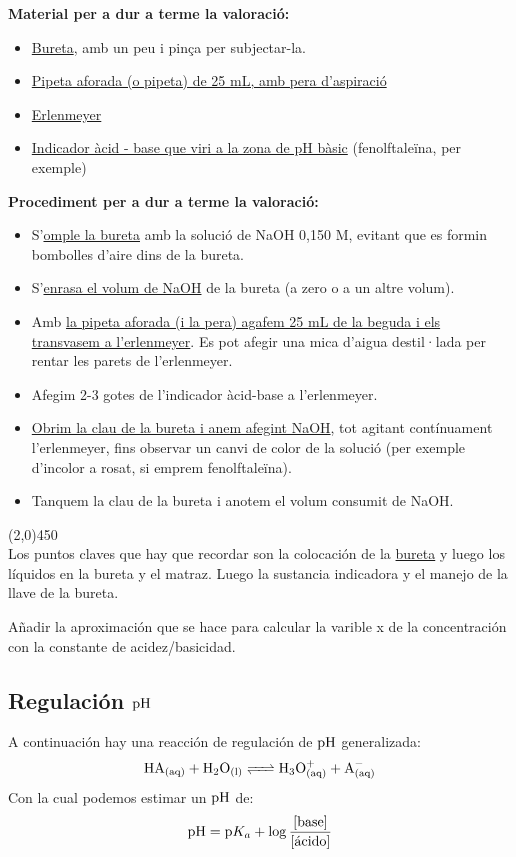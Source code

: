 \documentclass[arial,a4paper,print]{article}
\begin{document}
\textbf{Material per a dur a terme la valoració:}
\begin{itemize}
	\item \underline{Bureta}, amb un peu i pinça per subjectar-la.
	\item \underline{Pipeta aforada (o pipeta) de 25 mL, amb pera d’aspiració}
	\item \underline{Erlenmeyer}
	\item \underline{Indicador àcid - base que viri a la zona de pH bàsic} (fenolftaleïna, per exemple)
\end{itemize}
\textbf{Procediment per a dur a terme la valoració:}
\begin{itemize}
	\item S’\underline{omple la bureta} amb la solució de NaOH 0,150 M, evitant que es formin
bombolles d’aire dins de la bureta.
	\item S’\underline{enrasa el volum de NaOH} de la bureta (a zero o a un altre volum).
	\item Amb \underline{la pipeta aforada (i la pera) agafem 25 mL de la beguda i els transvasem a
l’erlenmeyer}. Es pot afegir una mica d’aigua destil·lada per rentar les parets
de l’erlenmeyer.
	\item Afegim 2-3 gotes de l’indicador àcid-base a l’erlenmeyer.
	\item \underline{Obrim la clau de la bureta i anem afegint NaOH}, tot agitant contínuament
l’erlenmeyer, fins observar un canvi de color de la solució (per exemple
d’incolor a rosat, si emprem fenolftaleïna).
	\item Tanquem la clau de la bureta i anotem el volum consumit de NaOH. 
\end{itemize}
\line(2,0){450}
\\
Los puntos claves que hay que recordar son la colocación de la \underline{bureta} y luego los líquidos en la bureta y el matraz. Luego la sustancia indicadora y el manejo de la llave de la bureta. 


Añadir la aproximación que se hace para calcular la varible x de la concentración con la constante de acidez/basicidad. 

\subsection{Regulación $\ce{pH}$}
A continuación hay una reacción de regulación de $\ce{pH}$ generalizada:
\begin{equation*}
	\ce{HA_{(aq)} + H2O_{(l)} <=> H3O^+_{(aq)} + A^-_{(aq)}}
\end{equation*}
Con la cual podemos estimar un $\ce{pH}$ de:
\begin{equation*}
	\ce{pH} = \ce{p}K_{a} + \log\frac{[\text{base}]}{[\text{ácido}]}
\end{equation*}
\end{document}
